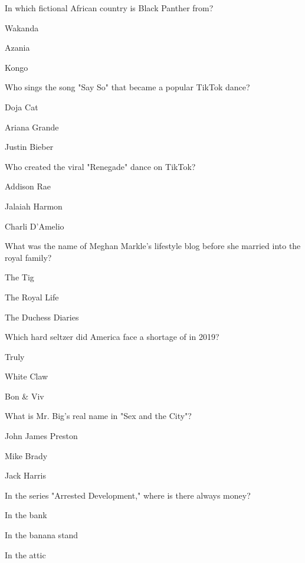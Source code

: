 \begin{enhancedmcq}{In which fictional African country is Black Panther from?}
\item Wakanda
\item Azania
\item Kongo

\end{enhancedmcq}
\begin{enhancedmcq}{Who sings the song "Say So" that became a popular TikTok dance?}
\item Doja Cat
\item Ariana Grande
\item Justin Bieber

\end{enhancedmcq}
\begin{enhancedmcq}{Who created the viral "Renegade" dance on TikTok?}
\item Addison Rae
\item Jalaiah Harmon
\item Charli D'Amelio

\end{enhancedmcq}
\begin{enhancedmcq}{What was the name of Meghan Markle's lifestyle blog before she married into the royal family?}
\item The Tig
\item The Royal Life
\item The Duchess Diaries

\end{enhancedmcq}
\begin{enhancedmcq}{Which hard seltzer did America face a shortage of in 2019?}
\item Truly
\item White Claw
\item Bon & Viv

\end{enhancedmcq}
\begin{enhancedmcq}{What is Mr. Big's real name in "Sex and the City"?}
\item John James Preston
\item Mike Brady
\item Jack Harris

\end{enhancedmcq}
\begin{enhancedmcq}{In the series "Arrested Development," where is there always money?}
\item In the bank
\item In the banana stand
\item In the attic

\end{enhancedmcq}
